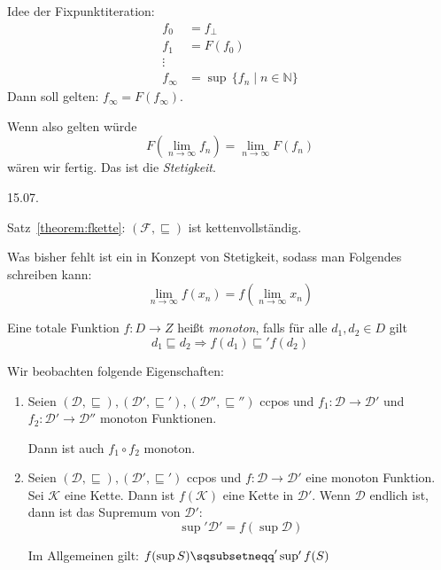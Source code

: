 Idee der Fixpunktiteration: \begin{align*}
    f_0 & = f_{\bot} \\
    f_1 & = F(f_0) \\
    \vdots \\
    f_{\infty} & = \sup \, \{ f_n \mid n \in \mathbb{N} \}
\end{align*}
Dann soll gelten: $f_{\infty} = F(f_{\infty})$.

Wenn also gelten würde \[
    F\left(\lim_{n \to \infty} f_n\right) = \lim_{n \to \infty} F(f_n)
\] wären wir fertig. Das ist die \emph{Stetigkeit}.



\newpage
\hfill 15.07.

\begin{remark}
    Satz~\ref{theorem:fkette}: $(\mathcal{F}, \sqsubseteq)$ ist kettenvollständig.

    Was bisher fehlt ist ein in Konzept von Stetigkeit, sodass man Folgendes schreiben kann: \[
        \lim_{n \to \infty} f(x_n) = f\left(\lim_{n \to \infty} x_n\right)
    \]
\end{remark}


\par\medskip
\begin{definition}[Monotonie]
    Eine totale Funktion $f: D \to Z$ heißt \emph{monoton}, falls für alle $d_1, d_2 \in D$ gilt \[
        d_1 \sqsubseteq d_2 \Rightarrow f(d_1) \sqsubseteq' f(d_2)
    \]
\end{definition}

\begin{observations}
    Wir beobachten folgende Eigenschaften:
    \begin{enumerate}
        \item Seien $(\mathcal{D}, \sqsubseteq), (\mathcal{D}',\sqsubseteq'), (\mathcal{D}'',\sqsubseteq'')$ ccpos und $f_1: \mathcal{D} \to \mathcal{D}'$ und $f_2: \mathcal{D}' \to \mathcal{D}''$ monoton Funktionen.

            Dann ist auch $f_1 \circ f_2$ monoton.
        \item Seien $(\mathcal{D}, \sqsubseteq), (\mathcal{D}',\sqsubseteq')$ ccpos und $f: \mathcal{D} \to \mathcal{D}'$ eine monoton Funktion. Sei $\mathcal{K}$ eine Kette. Dann ist $f(\mathcal{K})$ eine Kette in $\mathcal{D}'$. Wenn $\mathcal{D}$ endlich ist, dann ist das Supremum von $\mathcal{D}'$: \[
                \sup' \mathcal{D}' = f(\sup \mathcal{D})
            \]

            Im Allgemeinen gilt: $f(\sup S) \sqsubsetneqq' \sup' f(S)$
    \end{enumerate}
\end{observations}


